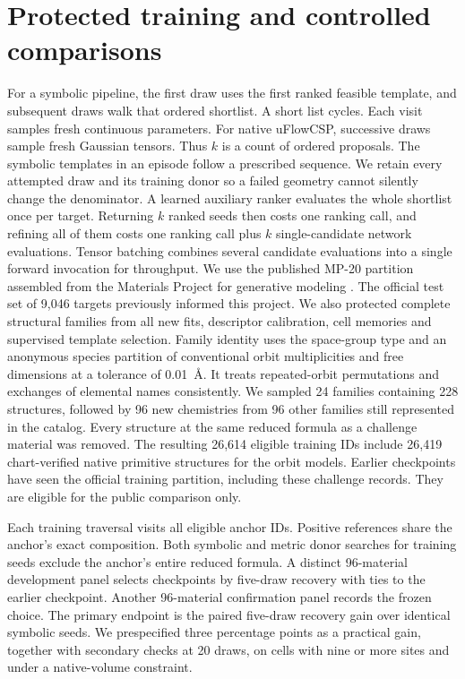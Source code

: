 \documentclass[10pt]{article}
\begin{document}
\section{Protected training and controlled comparisons}
For a symbolic pipeline, the first draw uses the first ranked feasible template, and subsequent draws walk that ordered shortlist. A short list cycles. Each visit samples fresh continuous parameters. For native uFlowCSP, successive draws sample fresh Gaussian tensors. Thus $k$ is a count of ordered proposals. The symbolic templates in an episode follow a prescribed sequence. We retain every attempted draw and its training donor so a failed geometry cannot silently change the denominator. A learned auxiliary ranker evaluates the whole shortlist once per target. Returning $k$ ranked seeds then costs one ranking call, and refining all of them costs one ranking call plus $k$ single-candidate network evaluations. Tensor batching combines several candidate evaluations into a single forward invocation for throughput.
We use the published MP-20 partition assembled from the Materials Project for generative modeling \cite{materialsproject,cdvae}. The official test set of 9,046 targets previously informed this project. We also protected complete structural families from all new fits, descriptor calibration, cell memories and supervised template selection. Family identity uses the space-group type and an anonymous species partition of conventional orbit multiplicities and free dimensions at a tolerance of 0.01~\AA. It treats repeated-orbit permutations and exchanges of elemental names consistently. We sampled 24 families containing 228 structures, followed by 96 new chemistries from 96 other families still represented in the catalog. Every structure at the same reduced formula as a challenge material was removed. The resulting 26,614 eligible training IDs include 26,419 chart-verified native primitive structures for the orbit models. Earlier checkpoints have seen the official training partition, including these challenge records. They are eligible for the public comparison only.

Each training traversal visits all eligible anchor IDs. Positive references share the anchor's exact composition. Both symbolic and metric donor searches for training seeds exclude the anchor's entire reduced formula. A distinct 96-material development panel selects checkpoints by five-draw recovery with ties to the earlier checkpoint. Another 96-material confirmation panel records the frozen choice. The primary endpoint is the paired five-draw recovery gain over identical symbolic seeds. We prespecified three percentage points as a practical gain, together with secondary checks at 20 draws, on cells with nine or more sites and under a native-volume constraint.
\end{document}

